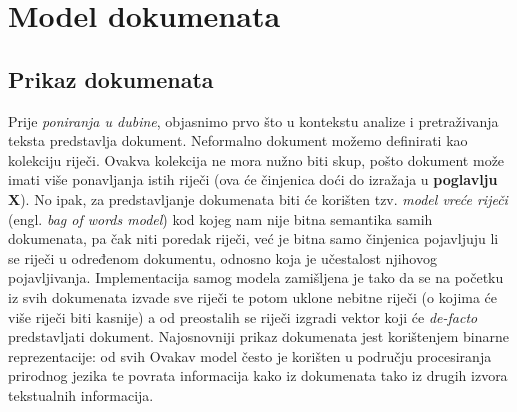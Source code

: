 \documentclass[times, utf8, zavrsni]{fer}
\begin{document}
\chapter{Model dokumenata}

\section{Prikaz dokumenata}
Prije \textit{poniranja u dubine}, objasnimo prvo što u kontekstu analize i pretraživanja teksta predstavlja dokument. Neformalno dokument možemo definirati kao kolekciju riječi. Ovakva kolekcija ne mora nužno biti skup, pošto dokument može imati više ponavljanja istih riječi (ova će činjenica doći do izražaja u \textbf{poglavlju X}). No ipak, za predstavljanje dokumenata biti će korišten tzv. \textit{model vreće riječi} (engl. \textit{bag of words model}) kod kojeg nam nije bitna semantika samih dokumenata, pa čak niti poredak riječi, već je bitna samo činjenica pojavljuju li se riječi u određenom dokumentu, odnosno koja je učestalost njihovog pojavljivanja.
Implementacija samog modela zamišljena je tako da se na početku iz svih dokumenata izvade sve riječi te potom uklone nebitne riječi (o kojima će više riječi biti kasnije) a od preostalih se riječi izgradi vektor koji će \textit{de-facto} predstavljati dokument. Najosnovniji prikaz dokumenata jest korištenjem binarne reprezentacije: od svih 
Ovakav model često je korišten u području procesiranja prirodnog jezika te povrata informacija kako iz dokumenata tako iz drugih izvora tekstualnih informacija.
\end{document}
